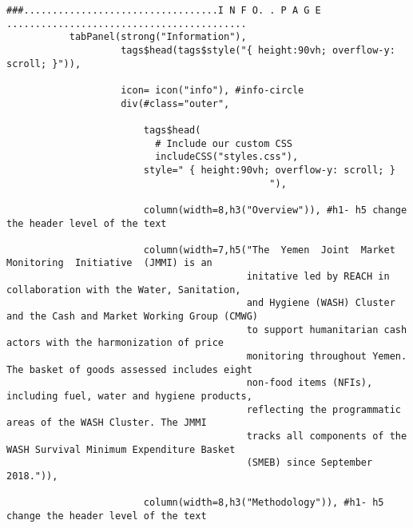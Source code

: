 \documentclass[
]{article}
\begin{document}
\begin{verbatim}
###..................................I N F O. . P A G E ..........................................
           tabPanel(strong("Information"),
                    tags$head(tags$style("{ height:90vh; overflow-y: scroll; }")),

                    icon= icon("info"), #info-circle
                    div(#class="outer",

                        tags$head(
                          # Include our custom CSS
                          includeCSS("styles.css"),
                        style=" { height:90vh; overflow-y: scroll; }
                                              "), 
                        
                        column(width=8,h3("Overview")), #h1- h5 change the header level of the text
                        
                        column(width=7,h5("The  Yemen  Joint  Market  Monitoring  Initiative  (JMMI) is an
                                          initative led by REACH in collaboration with the Water, Sanitation,
                                          and Hygiene (WASH) Cluster  and the Cash and Market Working Group (CMWG)
                                          to support humanitarian cash actors with the harmonization of price
                                          monitoring throughout Yemen. The basket of goods assessed includes eight 
                                          non-food items (NFIs), including fuel, water and hygiene products, 
                                          reflecting the programmatic areas of the WASH Cluster. The JMMI 
                                          tracks all components of the WASH Survival Minimum Expenditure Basket 
                                          (SMEB) since September 2018.")),
                        
                        column(width=8,h3("Methodology")), #h1- h5 change the header level of the text
                        

\end{verbatim}
\end{document}
